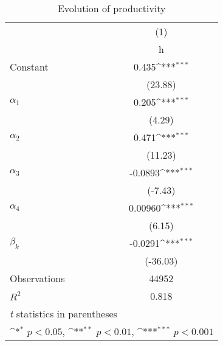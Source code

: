 \begin{table}[htbp]\centering
\def\sym#1{\ifmmode^{#1}\else\(^{#1}\)\fi}
\caption{Evolution of productivity\label{nls}}
\begin{tabular}{l*{1}{c}}
\hline\hline
                    &\multicolumn{1}{c}{(1)}\\
                    &\multicolumn{1}{c}{h}\\
\hline
Constant            &       0.435\sym{***}\\
                    &     (23.88)         \\
\hline
$\alpha_1$            &       0.205\sym{***}\\
                    &      (4.29)         \\
\hline
$\alpha_2$            &       0.471\sym{***}\\
                    &     (11.23)         \\
\hline
$\alpha_3$            &     -0.0893\sym{***}\\
                    &     (-7.43)         \\
\hline
$\alpha_4$            &     0.00960\sym{***}\\
                    &      (6.15)         \\
\hline
$\beta_k$            &     -0.0291\sym{***}\\
                    &    (-36.03)         \\
\hline
Observations        &       44952         \\
\(R^{2}\)           &       0.818         \\
\hline\hline
\multicolumn{2}{l}{\footnotesize \textit{t} statistics in parentheses}\\
\multicolumn{2}{l}{\footnotesize \sym{*} \(p<0.05\), \sym{**} \(p<0.01\), \sym{***} \(p<0.001\)}\\
\end{tabular}
\end{table}
